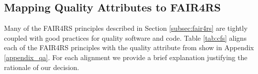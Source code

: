 \subsection{Mapping Quality Attributes to FAIR4RS}\label{subsec:fair4rs_fair}

Many of the FAIR4RS principles described in Section \ref{subsec:fair4rs}  are tightly coupled with good practices for quality software and code. Table \ref{tab:cfs} aligns each of the FAIR4RS principles with  the quality attribute from show in Appendix \ref{appendix_qa}. For each alignment we provide a brief explanation justifying the rationale of our decision. 



